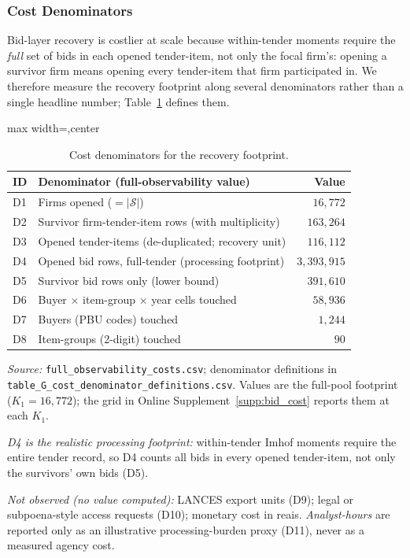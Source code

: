 \subsubsection{Cost Denominators}
\label{app:joint_scoring_submission}

Bid-layer recovery is costlier at scale because within-tender moments
require the \emph{full} set of bids in each opened tender-item, not only
the focal firm's: opening a survivor firm means opening every tender-item
that firm participated in. We therefore measure the recovery footprint
along several denominators rather than a single headline number;
Table~\ref{tab:G_denoms} defines them.

\begin{table}[htbp]\centering
\begin{adjustbox}{max width=\textwidth,center}
\begin{threeparttable}
\caption{Cost denominators for the recovery footprint.}
\label{tab:G_denoms}
\scriptsize
\begin{tabular}{llr}
\toprule
ID & Denominator (full-observability value) & Value \\
\midrule
D1 & Firms opened ($=|\mathcal{S}|$) & $16{,}772$ \\
D2 & Survivor firm-tender-item rows (with multiplicity) & $163{,}264$ \\
D3 & Opened tender-items (de-duplicated; recovery unit) & $116{,}112$ \\
D4 & Opened bid rows, full-tender (processing footprint) & $3{,}393{,}915$ \\
D5 & Survivor bid rows only (lower bound) & $391{,}610$ \\
D6 & Buyer $\times$ item-group $\times$ year cells touched & $58{,}936$ \\
D7 & Buyers (PBU codes) touched & $1{,}244$ \\
D8 & Item-groups (2-digit) touched & $90$ \\
\bottomrule
\end{tabular}
\begin{tablenotes}\scriptsize
\item \textit{Source:} \texttt{full\_observability\_costs.csv};
denominator definitions in \texttt{table\_G\_cost\_denominator\_definitions.csv}.
Values are the full-pool footprint ($K_1=16{,}772$); the grid in Online
Supplement~\ref{supp:bid_cost} reports them at each $K_1$.
\item \textit{D4 is the realistic processing footprint:} within-tender
Imhof moments require the entire tender record, so D4 counts all bids
in every opened tender-item, not only the survivors' own bids (D5).
\item \textit{Not observed (no value computed):} LANCES export units
(D9); legal or subpoena-style access requests (D10); monetary cost in
reais. \textit{Analyst-hours} are reported only as an illustrative
processing-burden proxy (D11), never as a measured agency cost.
\end{tablenotes}
\end{threeparttable}
\end{adjustbox}
\end{table}

